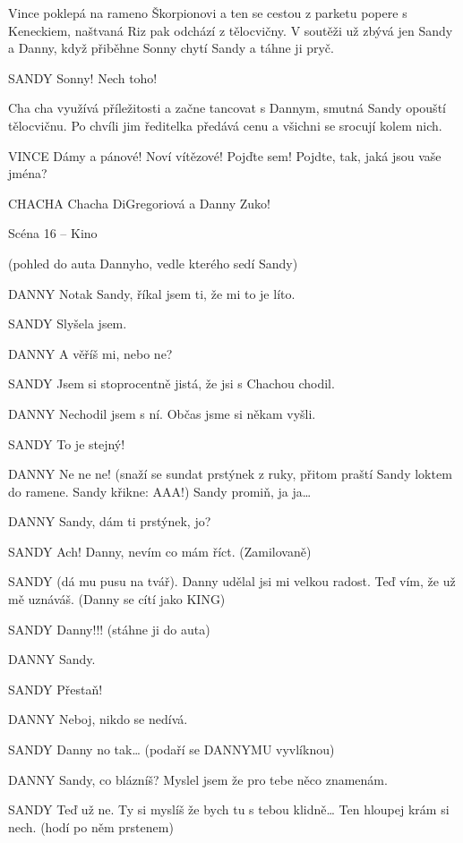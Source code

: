 Vince poklepá na rameno Škorpionovi a ten se cestou z parketu popere s Keneckiem, naštvaná Riz pak odchází z tělocvičny. V soutěži už zbývá jen Sandy a Danny, když přiběhne Sonny chytí Sandy a táhne ji pryč.

SANDY        Sonny! Nech toho!

Cha cha využívá příležitosti a začne tancovat s Dannym, smutná Sandy opouští tělocvičnu. Po chvíli jim ředitelka předává cenu a všichni se srocují kolem nich. 

VINCE        Dámy a pánové! Noví vítězové! Pojďte sem! Pojdte, tak, jaká jsou vaše         jména?

CHACHA        Chacha DiGregoriová a Danny Zuko!





Scéna 16  – Kino 

(pohled do auta Dannyho, vedle kterého sedí Sandy)

DANNY        Notak Sandy, říkal jsem ti, že mi to je líto. 

SANDY        Slyšela jsem. 

DANNY        A věříš mi, nebo ne?

SANDY        Jsem si stoprocentně jistá, že jsi s Chachou chodil. 

DANNY        Nechodil jsem s ní. Občas jsme si někam vyšli.

SANDY        To je stejný!

DANNY        Ne ne ne! (snaží se sundat prstýnek z ruky, přitom praští Sandy loktem         do ramene. Sandy křikne: AAA!) Sandy promiň, ja ja…

DANNY        Sandy, dám ti prstýnek, jo?

SANDY        Ach! Danny, nevím co mám říct. (Zamilovaně)

SANDY        (dá mu pusu na tvář). Danny udělal jsi mi velkou radost. Teď vím, že už mě uznáváš. (Danny se cítí jako KING)

SANDY        Danny!!! (stáhne ji do auta)

DANNY        Sandy. 

SANDY        Přestaň!

DANNY        Neboj, nikdo se nedívá. 

SANDY        Danny no tak… (podaří se DANNYMU vyvlíknou)

DANNY        Sandy, co blázníš? Myslel jsem že pro tebe něco znamenám. 

SANDY        Teď už ne. Ty si myslíš že bych tu s tebou klidně… Ten hloupej krám si         nech. (hodí po něm prstenem)

